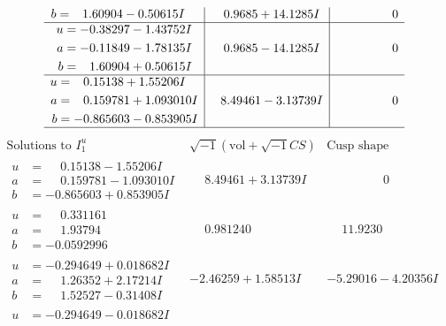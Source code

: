 \documentclass[1p]{elsarticle_modified}
\theoremstyle{definition}
\newcommand{\I}{\sqrt{-1}}
\begin{document}
$$\begin{array}{c|c|c}
\begin{aligned}
b &= \phantom{-}1.60904 - 0.50615 I\end{aligned}
 & \phantom{-}0.9685 + 14.1285 I & \phantom{-0.000000 } 0 \\ \hline\begin{aligned}
u &= -0.38297 - 1.43752 I \\
a &= -0.11849 - 1.78135 I \\
b &= \phantom{-}1.60904 + 0.50615 I\end{aligned}
 & \phantom{-}0.9685 - 14.1285 I & \phantom{-0.000000 } 0 \\ \hline\begin{aligned}
u &= \phantom{-}0.15138 + 1.55206 I \\
a &= \phantom{-}0.159781 + 1.093010 I \\
b &= -0.865603 - 0.853905 I\end{aligned}
 & \phantom{-}8.49461 - 3.13739 I & \phantom{-0.000000 } 0\\
 \hline 
 \end{array}$$\newpage$$\begin{array}{c|c|c}  
\text{Solutions to }I^u_{1}& \I (\text{vol} + \sqrt{-1}CS) & \text{Cusp shape}\\
 \hline 
\begin{aligned}
u &= \phantom{-}0.15138 - 1.55206 I \\
a &= \phantom{-}0.159781 - 1.093010 I \\
b &= -0.865603 + 0.853905 I\end{aligned}
 & \phantom{-}8.49461 + 3.13739 I & \phantom{-0.000000 } 0 \\ \hline\begin{aligned}
u &= \phantom{-}0.331161\phantom{ +0.000000I} \\
a &= \phantom{-}1.93794\phantom{ +0.000000I} \\
b &= -0.0592996\phantom{ +0.000000I}\end{aligned}
 & \phantom{-}0.981240\phantom{ +0.000000I} & \phantom{-}11.9230\phantom{ +0.000000I} \\ \hline\begin{aligned}
u &= -0.294649 + 0.018682 I \\
a &= \phantom{-}1.26352 + 2.17214 I \\
b &= \phantom{-}1.52527 - 0.31408 I\end{aligned}
 & -2.46259 + 1.58513 I & -5.29016 - 4.20356 I \\ \hline\begin{aligned}
u &= -0.294649 - 0.018682 I \\

\end{aligned}
\end{array}$$
\end{document}
